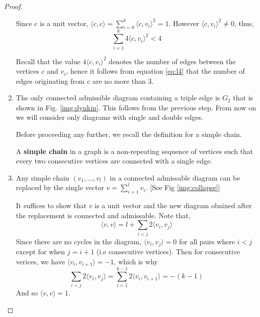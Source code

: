 \begin{proof}
\begin{enumerate}
        Since $c$ is a unit vector, $\langle c, c \rangle = \sum_{i=0}^k \langle c, v_i \rangle^2 = 1$. However 
        $\langle c, v_i \rangle^2 \not= 0$, thus,
            \begin{equation}
                \label{eq:l4}
                \sum_{i=1}^k 4\langle c, v_i \rangle^2 < 4
            \end{equation}
            
        Recall that the value $4\langle c, v_i \rangle^2$ denotes the number of edges between the vertices $c$ and $v_i$, hence
        it follows from equation \ref{eq:l4} that the number of edges originating from c are no more than 3.
            
        \item The only connected admissible diagram containing a triple edge is $G_2$ that is shown in Fig. \ref{img:dynkin}.
        This follows from the previous step. From now on we will consider only diagrams with single and double edges.
        
        Before proceeding any further, we recall the definition for a simple chain.
        \begin{definition}
            A \textbf{simple chain} in a graph is a non-repeating sequence of vertices such that every two consecutive vertices are
            connected with a single edge.
        \end{definition}

        \item Any simple chain $(v_1, ..., v_l)$ in a connected admissable diagram can be replaced by the single vector 
        $v = \sum_{i=1}^l v_i$. [See Fig \ref{img:collapse}]

        It suffices to show that $v$ is a unit vector and the new diagram obained after the replacement is connected and admissable.
        Note that,
            \begin{equation*}
                \langle v, v \rangle = l + \sum_{i < j} 2 \langle v_i, v_j \rangle
            \end{equation*}
        Since there are no cycles in the diagram, $\langle v_i, v_j \rangle = 0$ for all pairs where $i < j$ except for when $j = i+1$
        (i.e consecutive vertices). Then for consecutive verices, we have $\langle v_i, v_{i+1} \rangle = -1$, which is why 
        \begin{equation*}
            \sum_{i < j} 2 \langle v_i, v_j \rangle = \sum_{i  = 1}^{k-1} 2 \langle v_i, v_{i+1} \rangle = -(k-1)
        \end{equation*}
        And so $\langle v, v \rangle = 1$.


\end{enumerate}
\end{proof}
